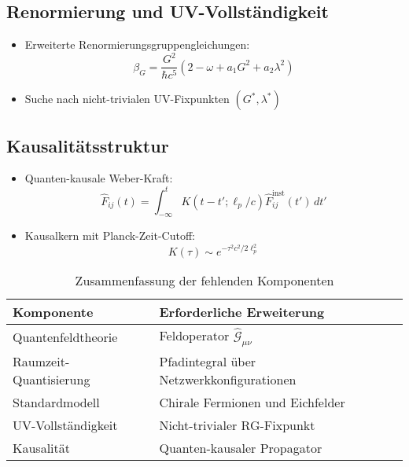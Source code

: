 \subsection{Renormierung und UV-Vollständigkeit}
\begin{itemize}
    \item Erweiterte Renormierungsgruppengleichungen:
    \begin{equation}
        \beta_G = \frac{G^2}{\hbar c^5}(2 - \omega + a_1G^2 + a_2\lambda^2)
    \end{equation}
    \item Suche nach nicht-trivialen UV-Fixpunkten $(G^*,\lambda^*)$
\end{itemize}

\subsection{Kausalitätsstruktur}
\begin{itemize}
    \item Quanten-kausale Weber-Kraft:
    \begin{equation}
        \hat{F}_{ij}(t) = \int_{-\infty}^t K(t-t';\ell_p/c)\hat{F}_{ij}^{\text{inst}}(t')\,dt'
    \end{equation}
    \item Kausalkern mit Planck-Zeit-Cutoff:
    \begin{equation}
        K(\tau) \sim e^{-\tau^2c^2/2\ell_p^2}
    \end{equation}
\end{itemize}

\begin{table}[h]
\centering
\caption{Zusammenfassung der fehlenden Komponenten}
\begin{tabular}{ll}
\toprule
\textbf{Komponente} & \textbf{Erforderliche Erweiterung} \\
\midrule
Quantenfeldtheorie & Feldoperator $\hat{\mathcal{G}}_{\mu\nu}$ \\
Raumzeit-Quantisierung & Pfadintegral über Netzwerkkonfigurationen \\
Standardmodell & Chirale Fermionen und Eichfelder \\
UV-Vollständigkeit & Nicht-trivialer RG-Fixpunkt \\
Kausalität & Quanten-kausaler Propagator \\
\bottomrule
\end{tabular}
\end{table}

